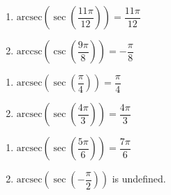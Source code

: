 \documentclass{ximera}
\begin{document}
\begin{multicols}{2}

\begin{enumerate}

\setcounter{enumi}{\value{HW}}

\item  $\text{arcsec}\left(\sec\left(\dfrac{11\pi}{12}\right) \right) = \dfrac{11\pi}{12}$
\item  $\text{arccsc}\left(\csc\left(\dfrac{9\pi}{8}\right) \right) = -\dfrac{\pi}{8}$ 

\setcounter{HW}{\value{enumi}}

\end{enumerate}

\end{multicols}



\begin{multicols}{2}

\begin{enumerate}

\setcounter{enumi}{\value{HW}}

\item  $\text{arcsec}\left(\sec\left(\dfrac{\pi}{4}\right) \right) = \dfrac{\pi}{4}$ 
\item  $\text{arcsec}\left(\sec\left(\dfrac{4\pi}{3}\right) \right) = \dfrac{4\pi}{3}$

\setcounter{HW}{\value{enumi}}

\end{enumerate}

\end{multicols}

\begin{multicols}{2}

\begin{enumerate}

\setcounter{enumi}{\value{HW}}

\item  $\text{arcsec}\left(\sec\left( \dfrac{5\pi}{6} \right) \right) = \dfrac{7\pi}{6}$
\item  $\text{arcsec}\left(\sec\left(-\dfrac{\pi}{2} \right) \right)$ is undefined. 

\setcounter{HW}{\value{enumi}}

\end{enumerate}

\end{multicols}
\end{document}
